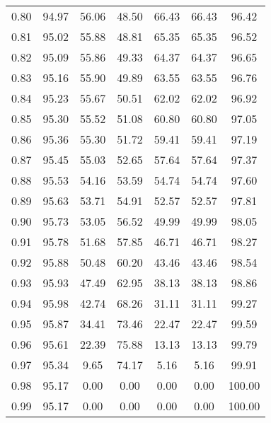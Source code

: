 \begin{tabular}{|c|c|c|c|c|c|c|}
      0.80 &     94.97 &     56.06 &      48.50 &   66.43 &      66.43 &         96.42 \\
      0.81 &     95.02 &     55.88 &      48.81 &   65.35 &      65.35 &         96.52 \\
      0.82 &     95.09 &     55.86 &      49.33 &   64.37 &      64.37 &         96.65 \\
      0.83 &     95.16 &     55.90 &      49.89 &   63.55 &      63.55 &         96.76 \\
      0.84 &     95.23 &     55.67 &      50.51 &   62.02 &      62.02 &         96.92 \\
      0.85 &     95.30 &     55.52 &      51.08 &   60.80 &      60.80 &         97.05 \\
      0.86 &     95.36 &     55.30 &      51.72 &   59.41 &      59.41 &         97.19 \\
      0.87 &     95.45 &     55.03 &      52.65 &   57.64 &      57.64 &         97.37 \\
      0.88 &     95.53 &     54.16 &      53.59 &   54.74 &      54.74 &         97.60 \\
      0.89 &     95.63 &     53.71 &      54.91 &   52.57 &      52.57 &         97.81 \\
      0.90 &     95.73 &     53.05 &      56.52 &   49.99 &      49.99 &         98.05 \\
      0.91 &     95.78 &     51.68 &      57.85 &   46.71 &      46.71 &         98.27 \\
      0.92 &     95.88 &     50.48 &      60.20 &   43.46 &      43.46 &         98.54 \\
      0.93 &     95.93 &     47.49 &      62.95 &   38.13 &      38.13 &         98.86 \\
      0.94 &     95.98 &     42.74 &      68.26 &   31.11 &      31.11 &         99.27 \\
      0.95 &     95.87 &     34.41 &      73.46 &   22.47 &      22.47 &         99.59 \\
      0.96 &     95.61 &     22.39 &      75.88 &   13.13 &      13.13 &         99.79 \\
      0.97 &     95.34 &      9.65 &      74.17 &    5.16 &       5.16 &         99.91 \\
      0.98 &     95.17 &      0.00 &       0.00 &    0.00 &       0.00 &        100.00 \\
      0.99 &     95.17 &      0.00 &       0.00 &    0.00 &       0.00 &        100.00 \\
\bottomrule
\end{tabular}
